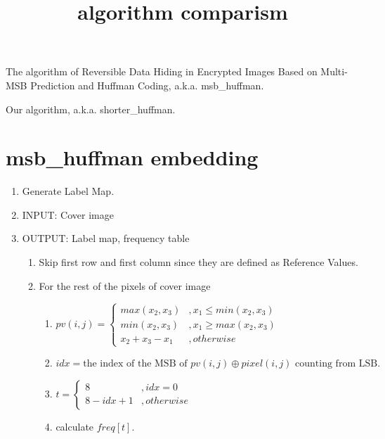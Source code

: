\documentclass{article}
\title{algorithm comparism}
\author{}
\begin{document}
\maketitle

The algorithm of Reversible Data Hiding in Encrypted Images Based on Multi-MSB Prediction and Huffman Coding, a.k.a. msb\_huffman. 


Our algorithm, a.k.a. shorter\_huffman.


\section{msb\_huffman embedding}
\begin{enumerate}
	\item Generate Label Map.
	\item[] INPUT: Cover image
	\item[] OUTPUT: Label map, frequency table
	      \begin{enumerate}
		      \item Skip first row and first column since they are defined as Reference Values.
		      \item For the rest of the pixels of cover image
		            \begin{enumerate}
			            \item 
			                  $pv(i, j) = \left\{
				                  \begin{array}{rl}
					                  max(x_2, x_3)   & , x_1 \leq min(x_2, x_3) \\
					                  min(x_2, x_3)   & , x_1 \geq max(x_2, x_3) \\
					                  x_2 + x_3 - x_1 & , otherwise
				                  \end{array} \right. $
			            \item $idx = \textrm{the index of the MSB of } pv(i, j) \oplus pixel(i, j) \textrm{ counting from LSB.}$
			            \item 
			                  $t = \left\{
				                  \begin{array}{rl}
					                  8           & , idx = 0   \\
					                  8 - idx + 1 & , otherwise
				                  \end{array} \right.$
			            \item calculate $freq[t]$.
		            \end{enumerate}
	      \end{enumerate}

\end{enumerate}
\end{document}
